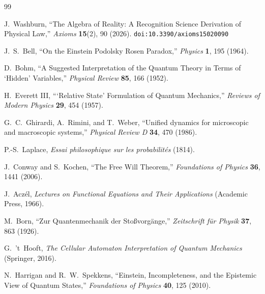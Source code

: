 \documentclass[12pt,a4paper]{article}
\theoremstyle{definition}
\theoremstyle{remark}
\begin{document}
\begin{thebibliography}{99}

J.~Washburn, ``The Algebra of Reality: A Recognition Science Derivation
of Physical Law,'' \emph{Axioms} \textbf{15}(2), 90 (2026).
\texttt{doi:10.3390/axioms15020090}

J.~S.~Bell, ``On the Einstein Podolsky Rosen Paradox,''
\emph{Physics} \textbf{1}, 195 (1964).

D.~Bohm, ``A Suggested Interpretation of the Quantum Theory in Terms of
`Hidden' Variables,'' \emph{Physical Review} \textbf{85}, 166 (1952).

H.~Everett III, ```Relative State' Formulation of Quantum Mechanics,''
\emph{Reviews of Modern Physics} \textbf{29}, 454 (1957).

G.~C.~Ghirardi, A.~Rimini, and T.~Weber, ``Unified dynamics for
microscopic and macroscopic systems,'' \emph{Physical Review D}
\textbf{34}, 470 (1986).

P.-S.~Laplace, \emph{Essai philosophique sur les probabilit\'es} (1814).

J.~Conway and S.~Kochen, ``The Free Will Theorem,''
\emph{Foundations of Physics} \textbf{36}, 1441 (2006).

J.~Acz\'el, \emph{Lectures on Functional Equations and Their
Applications} (Academic Press, 1966).

M.~Born, ``Zur Quantenmechanik der Sto\ss vorg\"ange,''
\emph{Zeitschrift f\"ur Physik} \textbf{37}, 863 (1926).

G.~'t~Hooft, \emph{The Cellular Automaton Interpretation of Quantum
Mechanics} (Springer, 2016).

N.~Harrigan and R.~W.~Spekkens, ``Einstein, Incompleteness, and the
Epistemic View of Quantum States,''
\emph{Foundations of Physics} \textbf{40}, 125 (2010).

\end{thebibliography}
\end{document}
